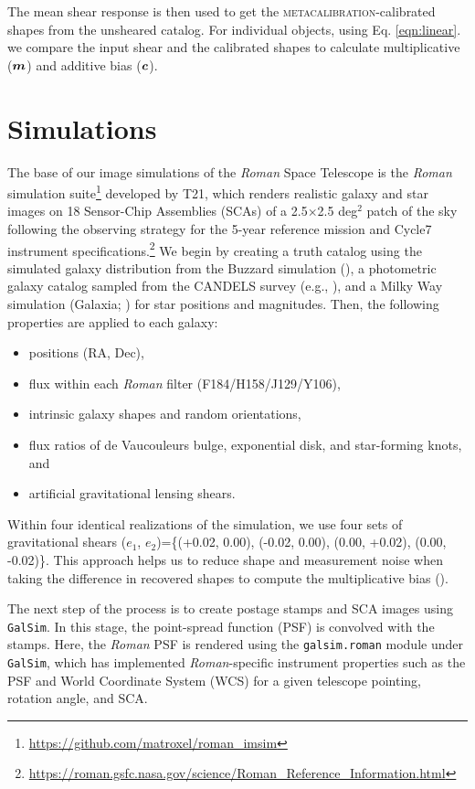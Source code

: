 \documentclass[fleqn,usenatbib]{mnras}
\begin{document}
The mean shear response is then used to get the \textsc{metacalibration}-calibrated shapes from the unsheared catalog. For individual objects, using Eq. \ref{eqn:linear}. we compare the input shear and the calibrated shapes to calculate multiplicative ($\vb*{m}$) and additive bias ($\vb*{c}$).


\section{Simulations}
\label{sec:sims}
The base of our image simulations of the \emph{Roman} Space Telescope is the \emph{Roman} simulation suite\footnote{\url{ https://github.com/matroxel/roman_imsim}} developed by T21, which renders realistic galaxy and star images on 18 Sensor-Chip Assemblies (SCAs) of a 2.5$\times$2.5 deg$^{2}$ patch of the sky following the observing strategy for the 5-year reference mission and Cycle7 instrument specifications.\footnote{\url{https://roman.gsfc.nasa.gov/science/Roman_Reference_Information.html}} We begin by creating a truth catalog using the simulated galaxy distribution from the Buzzard simulation (\citealt{2019arXiv190102401D}), a photometric galaxy catalog sampled from the CANDELS survey (e.g., \citealt{2019ApJ...877..117H}), and a Milky Way simulation (Galaxia; \citealt{2011ApJ...730....3S}) for star positions and magnitudes. Then, the following properties are applied to each galaxy:
\begin{itemize}
    \item positions (RA, Dec),
    \item flux within each \emph{Roman} filter (F184/H158/J129/Y106),
    \item intrinsic galaxy shapes and random orientations,
    \item flux ratios of de Vaucouleurs bulge, exponential disk, and star-forming knots, and
    \item artificial gravitational lensing shears.
\end{itemize} 
Within four identical realizations of the simulation, we use four sets of gravitational shears ($e_{1}$, $e_{2}$)=\{(+0.02, 0.00), (-0.02, 0.00), (0.00, +0.02), (0.00, -0.02)\}. This approach helps us to reduce shape and measurement noise when taking the difference in recovered shapes to compute the multiplicative bias (\citealt{2019A&A...621A...2P}). 


The next step of the process is to create postage stamps and SCA images using \texttt{GalSim}. In this stage, the point-spread function (PSF) is convolved with the stamps. Here, the \emph{Roman} PSF is rendered using the \texttt{galsim.roman} module under \texttt{GalSim}, which has implemented \emph{Roman}-specific instrument properties such as the PSF and World Coordinate System (WCS) for a given telescope pointing, rotation angle, and SCA.
\end{document}
